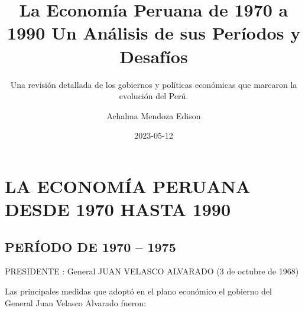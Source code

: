 \documentclass[
  letterpaper,
  DIV=11,
  numbers=noendperiod]{scrartcl}
\title{La Economía Peruana de 1970 a 1990 Un Análisis de sus Períodos y
Desafíos}
\subtitle{Una revisión detallada de los gobiernos y políticas económicas
que marcaron la evolución del Perú.}
\author{Achalma Mendoza Edison}
\date{2023-05-12}
\begin{document}
\maketitle
\ifdefined\Shaded\renewenvironment{Shaded}{\begin{tcolorbox}[frame hidden, boxrule=0pt, borderline west={3pt}{0pt}{shadecolor}, breakable, enhanced, sharp corners, interior hidden]}{\end{tcolorbox}}\fi

\hypertarget{la-economuxeda-peruana-desde-1970-hasta-1990}{%
\section{LA ECONOMÍA PERUANA DESDE 1970 HASTA
1990}\label{la-economuxeda-peruana-desde-1970-hasta-1990}}

\hypertarget{peruxedodo-de-1970-1975}{%
\subsection{PERÍODO DE 1970 -- 1975}\label{peruxedodo-de-1970-1975}}

PRESIDENTE : General JUAN VELASCO ALVARADO (3 de octubre de 1968)

Las principales medidas que adoptó en el plano económico el gobierno del
General Juan Velasco Alvarado fueron:
\end{document}
